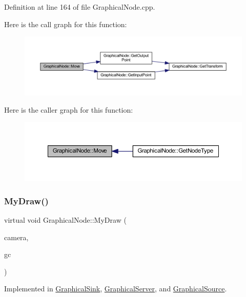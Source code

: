 Definition at line 164 of file Graphical\+Node.\+cpp.

Here is the call graph for this function\+:
\nopagebreak
\begin{figure}[H]
\begin{center}
\leavevmode
\includegraphics[width=350pt]{class_graphical_node_a430fbd68a5d907ed9e73981ab3c499fb_cgraph}
\end{center}
\end{figure}
Here is the caller graph for this function\+:
\nopagebreak
\begin{figure}[H]
\begin{center}
\leavevmode
\includegraphics[width=350pt]{class_graphical_node_a430fbd68a5d907ed9e73981ab3c499fb_icgraph}
\end{center}
\end{figure}
\mbox{\label{class_graphical_node_a4a5d4f48454a9721a940499d4f59b0ce}} 
\subsubsection{\texorpdfstring{My\+Draw()}{MyDraw()}}
{\footnotesize\ttfamily virtual void Graphical\+Node\+::\+My\+Draw (\begin{DoxyParamCaption}\item[{const wx\+Affine\+Matrix2D \&}]{camera,  }\item[{wx\+Graphics\+Context $\ast$}]{gc }\end{DoxyParamCaption})\hspace{0.3cm}{\ttfamily [pure virtual]}}



Implemented in \hyperlink{class_graphical_sink_abac58f5bfe23ab2a799560171c036507}{Graphical\+Sink}, \hyperlink{class_graphical_server_ad144b6cfdf945981fd0db425dfc41e5b}{Graphical\+Server}, and \hyperlink{class_graphical_source_af01b1de06f0e6653edd60b59a279b154}{Graphical\+Source}.

